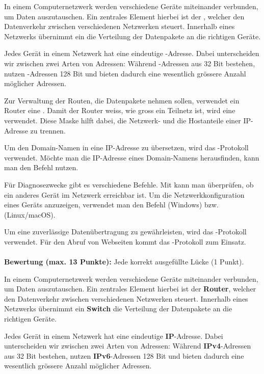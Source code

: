 \begin{myexercise}

    In einem Computernetzwerk werden verschiedene Geräte miteinander verbunden, um Daten auszutauschen. Ein zentrales Element hierbei ist der , welcher den Datenverkehr zwischen verschiedenen Netzwerken steuert. Innerhalb eines Netzwerks übernimmt ein  die Verteilung der Datenpakete an die richtigen Geräte.

    Jedes Gerät in einem Netzwerk hat eine eindeutige -Adresse. Dabei unterscheiden wir zwischen zwei Arten von Adressen: Während -Adressen aus 32 Bit bestehen, nutzen -Adressen 128 Bit und bieten dadurch eine wesentlich grössere Anzahl möglicher Adressen.

    Zur Verwaltung der Routen, die Datenpakete nehmen sollen, verwendet ein Router eine . Damit der Router weiss, wie gross ein Teilnetz ist, wird eine  verwendet. Diese Maske hilft dabei, die Netzwerk- und die Hostanteile einer IP-Adresse zu trennen.

    Um den Domain-Namen in eine IP-Adresse zu übersetzen, wird das -Protokoll verwendet. Möchte man die IP-Adresse eines Domain-Namens herausfinden, kann man den Befehl  nutzen.

    Für Diagnosezwecke gibt es verschiedene Befehle. Mit  kann man überprüfen, ob ein anderes Gerät im Netzwerk erreichbar ist. Um die Netzwerkkonfiguration eines Geräts anzuzeigen, verwendet man den Befehl  (Windows) bzw.  (Linux/macOS).

    Um eine zuverlässige Datenübertragung zu gewährleisten, wird das -Protokoll verwendet. Für den Abruf von Webseiten kommt das -Protokoll zum Einsatz.
    \\[.5cm]
    \\[.5cm]
    \textbf{Bewertung (max. 13 Punkte):} Jede korrekt ausgefüllte Lücke (1 Punkt).
    \begin{myanswer}
        In einem Computernetzwerk werden verschiedene Geräte miteinander verbunden, um Daten auszutauschen. Ein zentrales Element hierbei ist der \textbf{Router}, welcher den Datenverkehr zwischen verschiedenen Netzwerken steuert. Innerhalb eines Netzwerks übernimmt ein \textbf{Switch} die Verteilung der Datenpakete an die richtigen Geräte.

        Jedes Gerät in einem Netzwerk hat eine eindeutige \textbf{IP}-Adresse. Dabei unterscheiden wir zwischen zwei Arten von Adressen: Während \textbf{IPv4}-Adressen aus 32 Bit bestehen, nutzen \textbf{IPv6}-Adressen 128 Bit und bieten dadurch eine wesentlich grössere Anzahl möglicher Adressen.


\end{myanswer}
\end{myexercise}
